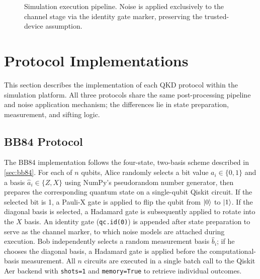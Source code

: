 \documentclass[10pt, a4paper]{report}
\begin{document}
\begin{figure}[ht]
    \centering
    \caption{Simulation execution pipeline. Noise is applied exclusively to the channel stage via the identity gate marker, preserving the trusted-device assumption.}
    \label{fig:pipeline}
\end{figure}


\section{Protocol Implementations}
\label{sec:protocol-implementations}

This section describes the implementation of each QKD protocol within the simulation platform. All three protocols share the same post-processing pipeline and noise application mechanism; the differences lie in state preparation, measurement, and sifting logic.

\subsection{BB84 Protocol}

The BB84 implementation follows the four-state, two-basis scheme described in \cref{sec:bb84}. For each of $n$ qubits, Alice randomly selects a bit value $a_i \in \{0,1\}$ and a basis $\hat{a}_i \in \{Z, X\}$ using NumPy's pseudorandom number generator, then prepares the corresponding quantum state on a single-qubit Qiskit circuit. If the selected bit is 1, a Pauli-X gate is applied to flip the qubit from $\ket{0}$ to $\ket{1}$. If the diagonal basis is selected, a Hadamard gate is subsequently applied to rotate into the $X$ basis. An identity gate (\texttt{qc.id(0)}) is appended after state preparation to serve as the channel marker, to which noise models are attached during execution. Bob independently selects a random measurement basis $\hat{b}_i$; if he chooses the diagonal basis, a Hadamard gate is applied before the computational-basis measurement. All $n$ circuits are executed in a single batch call to the Qiskit Aer backend with \texttt{shots=1} and \texttt{memory=True} to retrieve individual outcomes.
\end{document}
